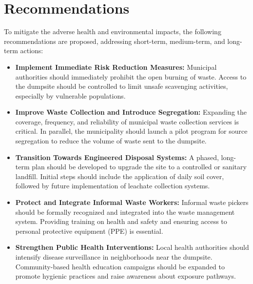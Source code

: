 \section{Recommendations}
To mitigate the adverse health and environmental impacts, the following recommendations are proposed, addressing short-term, medium-term, and long-term actions:

\begin{itemize}
    \item \textbf{Implement Immediate Risk Reduction Measures:} Municipal authorities should immediately prohibit the open burning of waste. Access to the dumpsite should be controlled to limit unsafe scavenging activities, especially by vulnerable populations.

    \item \textbf{Improve Waste Collection and Introduce Segregation:} Expanding the coverage, frequency, and reliability of municipal waste collection services is critical. In parallel, the municipality should launch a pilot program for source segregation to reduce the volume of waste sent to the dumpsite.

    \item \textbf{Transition Towards Engineered Disposal Systems:} A phased, long-term plan should be developed to upgrade the site to a controlled or sanitary landfill. Initial steps should include the application of daily soil cover, followed by future implementation of leachate collection systems.

    \item \textbf{Protect and Integrate Informal Waste Workers:} Informal waste pickers should be formally recognized and integrated into the waste management system. Providing training on health and safety and ensuring access to personal protective equipment (PPE) is essential.

    \item \textbf{Strengthen Public Health Interventions:} Local health authorities should intensify disease surveillance in neighborhoods near the dumpsite. Community-based health education campaigns should be expanded to promote hygienic practices and raise awareness about exposure pathways.
\end{itemize}

